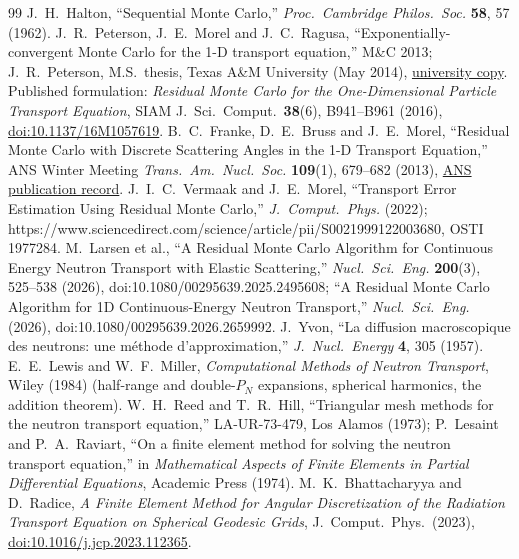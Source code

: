\documentclass[11pt]{article}
\begin{document}
\begin{thebibliography}{99}
 J.~H.~Halton, ``Sequential Monte Carlo,'' \emph{Proc.\ Cambridge
  Philos.\ Soc.} \textbf{58}, 57 (1962).
 J.~R.~Peterson, J.~E.~Morel and J.~C.~Ragusa,
  ``Exponentially-convergent Monte Carlo for the 1-D transport equation,'' M\&C 2013;
  J.~R.~Peterson, M.S.\ thesis, Texas A\&M University (May 2014),
  \href{https://oaktrust.library.tamu.edu/bitstreams/69ab2dae-3fef-4daf-96d0-2bd1896d81e3/download}
  {university copy}.
  Published formulation: \emph{Residual Monte Carlo for the One-Dimensional
  Particle Transport Equation}, SIAM J.\ Sci.\ Comput.\ \textbf{38}(6),
  B941--B961 (2016), \href{https://doi.org/10.1137/16M1057619}{doi:10.1137/16M1057619}.
 B.~C.~Franke, D.~E.~Bruss and J.~E.~Morel, ``Residual Monte Carlo with
  Discrete Scattering Angles in the 1-D Transport Equation,'' ANS Winter Meeting
  \emph{Trans.\ Am.\ Nucl.\ Soc.} \textbf{109}(1), 679--682 (2013),
  \href{https://www.ans.org/pubs/transactions/volume-109/}{ANS publication record}.
 J.~I.~C.~Vermaak and J.~E.~Morel, ``Transport Error Estimation Using
  Residual Monte Carlo,'' \emph{J.\ Comput.\ Phys.} (2022);
  https://www.sciencedirect.com/science/article/pii/S0021999122003680, OSTI 1977284.
 M.~Larsen et al., ``A Residual Monte Carlo Algorithm for Continuous
  Energy Neutron Transport with Elastic Scattering,'' \emph{Nucl.\ Sci.\ Eng.}
  \textbf{200}(3), 525--538 (2026), doi:10.1080/00295639.2025.2495608;
  ``A Residual Monte Carlo Algorithm for 1D Continuous-Energy
  Neutron Transport,'' \emph{Nucl.\ Sci.\ Eng.} (2026), doi:10.1080/00295639.2026.2659992.
 J.~Yvon, ``La diffusion macroscopique des neutrons: une m\'ethode
  d'approximation,'' \emph{J.\ Nucl.\ Energy} \textbf{4}, 305 (1957).
 E.~E.~Lewis and W.~F.~Miller, \emph{Computational Methods of Neutron
  Transport}, Wiley (1984) (half-range and double-$P_N$ expansions, spherical
  harmonics, the addition theorem).
 W.~H.~Reed and T.~R.~Hill, ``Triangular mesh methods for the neutron
  transport equation,'' LA-UR-73-479, Los Alamos (1973); P.~Lesaint and P.~A.~Raviart,
  ``On a finite element method for solving the neutron transport equation,'' in
  \emph{Mathematical Aspects of Finite Elements in Partial Differential Equations},
  Academic Press (1974).
 M.~K.~Bhattacharyya and D.~Radice,
  \emph{A Finite Element Method for Angular Discretization of the Radiation
  Transport Equation on Spherical Geodesic Grids}, J.\ Comput.\ Phys.\ (2023),
  \href{https://doi.org/10.1016/j.jcp.2023.112365}{doi:10.1016/j.jcp.2023.112365}.
\end{thebibliography}
\end{document}
